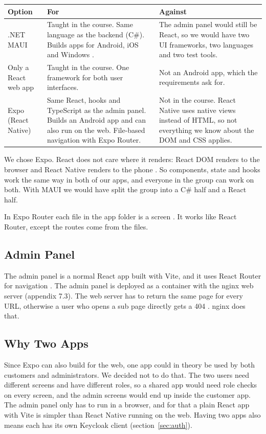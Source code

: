 \documentclass[a4paper,11pt]{article}
\begin{document}
\begin{center}
\begin{tabular}{@{}p{3.1cm} p{5.6cm} p{5.6cm}@{}}
\textbf{Option} & \textbf{For} & \textbf{Against} \\
\hline
.NET MAUI & Taught in the course. Same language as the backend (C\#). Builds apps for Android, iOS and Windows \cite[sec.~1.2]{goldman-maui-in-action}. & The admin panel would still be React, so we would have two UI frameworks, two languages and two test tools. \\
\hline
Only a React web app & Taught in the course. One framework for both user interfaces. & Not an Android app, which the requirements ask for. \\
\hline
Expo (React Native) & Same React, hooks and TypeScript as the admin panel. Builds an Android app and can also run on the web. File-based navigation with Expo Router. & Not in the course. React Native uses native views instead of HTML, so not everything we know about the DOM and CSS applies. \\
\hline
\end{tabular}
\end{center}

We chose Expo. React does not care where it renders: React DOM renders to the browser and React Native renders to the phone \cite[sec.~1.5.1, pp.~16--17]{mardan-react-quickly}. So components, state and hooks work the same way in both of our apps, and everyone in the group can work on both. With MAUI we would have split the group into a C\# half and a React half.

In Expo Router each file in the app folder is a screen \cite{expo-router-introduction}. It works like React Router, except the routes come from the files.

\subsection{Admin Panel}
The admin panel is a normal React app built with Vite, and it uses React Router for navigation \cite[ch.~13]{mardan-react-quickly}.
The admin panel is deployed as a container with the nginx web server (appendix 7.3). The web server has to return the same page for every URL, otherwise a user who opens a sub page directly gets a 404 \cite[sec.~13.2.3]{mardan-react-quickly}. nginx does that.

\subsection{Why Two Apps}
Since Expo can also build for the web, one app could in theory be used by both customers and administrators. We decided not to do that. The two users need different screens and have different roles, so a shared app would need role checks on every screen, and the admin screens would end up inside the customer app. The admin panel only has to run in a browser, and for that a plain React app with Vite is simpler than React Native running on the web. Having two apps also means each has its own Keycloak client (section~\ref{sec:auth}).
\end{document}
